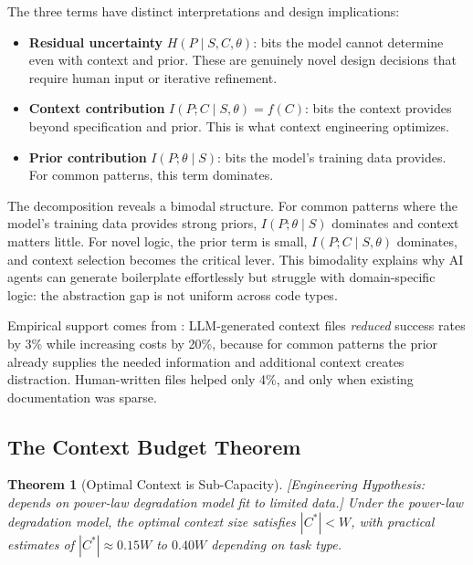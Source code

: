 \documentclass[11pt, a4paper]{googledeepmind}
\newtheorem{theorem}{Theorem}[section]
\begin{document}
The three terms have distinct interpretations and design implications:

\begin{itemize}[nosep]
    \item \textbf{Residual uncertainty} $H(P \mid S, C, \theta)$: bits the model cannot determine even with context and prior. These are genuinely novel design decisions that require human input or iterative refinement.
    \item \textbf{Context contribution} $I(P; C \mid S, \theta) = f(C)$: bits the context provides beyond specification and prior. This is what context engineering optimizes.
    \item \textbf{Prior contribution} $I(P; \theta \mid S)$: bits the model's training data provides. For common patterns, this term dominates.
\end{itemize}

The decomposition reveals a bimodal structure. For common patterns where the model's training data provides strong priors, $I(P; \theta \mid S)$ dominates and context matters little. For novel logic, the prior term is small, $I(P; C \mid S, \theta)$ dominates, and context selection becomes the critical lever. This bimodality explains why AI agents can generate boilerplate effortlessly but struggle with domain-specific logic: the abstraction gap is not uniform across code types.

Empirical support comes from \citet{gloaguen2026agents}: LLM-generated context files \emph{reduced} success rates by 3\% while increasing costs by 20\%, because for common patterns the prior already supplies the needed information and additional context creates distraction. Human-written files helped only 4\%, and only when existing documentation was sparse.

\subsection{The Context Budget Theorem}

\begin{theorem}[Optimal Context is Sub-Capacity]
\emph{[Engineering Hypothesis: depends on power-law degradation model fit to limited data.]}
\label{thm:context-budget}
Under the power-law degradation model, the optimal context size satisfies $|C^*| < W$, with practical estimates of $|C^*| \approx 0.15W$ to $0.40W$ depending on task type.
\end{theorem}
\end{document}
